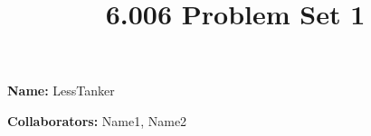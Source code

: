 \documentclass[12pt,twoside]{article}
\title{6.006 Problem Set 1}
\newcommand{\theproblemsetnum}{1}
\begin{document}

\setlength{\parindent}{0pt}
\medskip\hrulefill\medskip

{\bf Name:} LessTanker

\medskip

{\bf Collaborators:} Name1, Name2

\medskip\hrulefill






\end{document}
